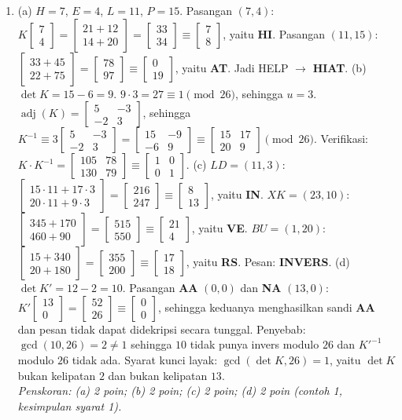 \documentclass[a4paper,11pt]{article}
\newcommand{\sm}[1]{\left[\begin{smallmatrix}#1\end{smallmatrix}\right]}
\newcommand{\adj}{\operatorname{adj}}
\begin{document}
\begin{enumerate}[leftmargin=2em,itemsep=3pt,topsep=2pt]
\item[\textbf{5.}] (a) $H=7$, $E=4$, $L=11$, $P=15$. Pasangan $(7,4)$: $K\sm{7\\4}=\sm{21+12\\14+20}=\sm{33\\34}\equiv\sm{7\\8}$, yaitu \textbf{HI}. Pasangan $(11,15)$: $\sm{33+45\\22+75}=\sm{78\\97}\equiv\sm{0\\19}$, yaitu \textbf{AT}. Jadi HELP $\to$ \textbf{HIAT}. (b) $\det K=15-6=9$. $9\cdot3=27\equiv1\pmod{26}$, sehingga $u=3$. $\adj(K)=\sm{5&-3\\-2&3}$, sehingga $K^{-1}\equiv3\sm{5&-3\\-2&3}=\sm{15&-9\\-6&9}\equiv\sm{15&17\\20&9}\pmod{26}$. Verifikasi: $K\cdot K^{-1}=\sm{105&78\\130&79}\equiv\sm{1&0\\0&1}$. (c) $LD=(11,3)$: $\sm{15\cdot11+17\cdot3\\20\cdot11+9\cdot3}=\sm{216\\247}\equiv\sm{8\\13}$, yaitu \textbf{IN}. $XK=(23,10)$: $\sm{345+170\\460+90}=\sm{515\\550}\equiv\sm{21\\4}$, yaitu \textbf{VE}. $BU=(1,20)$: $\sm{15+340\\20+180}=\sm{355\\200}\equiv\sm{17\\18}$, yaitu \textbf{RS}. Pesan: \textbf{INVERS}. (d) $\det K'=12-2=10$. Pasangan \textbf{AA} $(0,0)$ dan \textbf{NA} $(13,0)$: $K'\sm{13\\0}=\sm{52\\26}\equiv\sm{0\\0}$, sehingga keduanya menghasilkan sandi \textbf{AA} dan pesan tidak dapat didekripsi secara tunggal. Penyebab: $\gcd(10,26)=2\neq1$ sehingga $10$ tidak punya invers modulo $26$ dan $K'^{-1}$ modulo $26$ tidak ada. Syarat kunci layak: $\gcd(\det K,26)=1$, yaitu $\det K$ bukan kelipatan $2$ dan bukan kelipatan $13$. \\ \textit{Penskoran: (a) 2 poin; (b) 2 poin; (c) 2 poin; (d) 2 poin (contoh 1, kesimpulan syarat 1).}
\end{enumerate}
\end{document}
